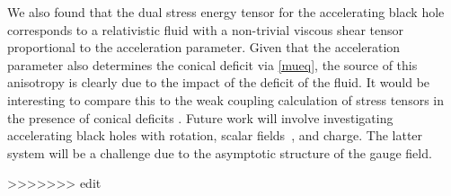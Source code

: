 \documentclass[
twoside,
openright,
frontopenright,
]{dmathesis}
\begin{document}
We also found that the dual stress energy tensor for the accelerating
black hole corresponds to a relativistic fluid with a non-trivial viscous
shear tensor proportional to the acceleration parameter. Given that
the acceleration parameter also determines the conical deficit via
\eqref{mueq}, the source of this anisotropy is clearly due to the impact
of the deficit of the fluid. It would be interesting to compare this to
the weak coupling calculation of stress tensors in the presence of
conical deficits \cite{Dowker:1977zj}.
Future work will involve investigating accelerating black holes with rotation,
scalar fields~\cite{Anabalon:2009qt, Anabalon:2012ta}, and charge. The latter
system will be a challenge due to the asymptotic structure of the gauge field.

>>>>>>> edit




%
%


{}


\end{document}

